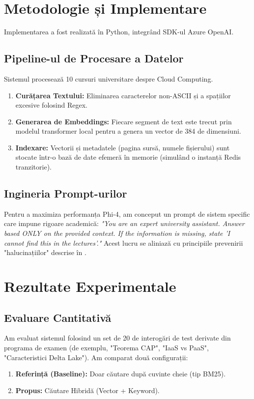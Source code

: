 \documentclass[conference]{IEEEtran}
\begin{document}
\section{Metodologie și Implementare}

Implementarea a fost realizată în Python, integrând SDK-ul Azure OpenAI.

\subsection{Pipeline-ul de Procesare a Datelor}
Sistemul procesează 10 cursuri universitare despre Cloud Computing.
\begin{enumerate}
    \item \textbf{Curățarea Textului:} Eliminarea caracterelor non-ASCII și a spațiilor excesive folosind Regex.
    \item \textbf{Generarea de Embeddings:} Fiecare segment de text este trecut prin modelul transformer local pentru a genera un vector de 384 de dimensiuni.
    \item \textbf{Indexare:} Vectorii și metadatele (pagina sursă, numele fișierului) sunt stocate într-o bază de date efemeră în memorie (simulând o instanță Redis tranzitorie).
\end{enumerate}

\subsection{Ingineria Prompt-urilor}
Pentru a maximiza performanța Phi-4, am conceput un prompt de sistem specific care impune rigoare academică:
\textit{"You are an expert university assistant. Answer based ONLY on the provided context. If the information is missing, state 'I cannot find this in the lectures'."}
Acest lucru se aliniază cu principiile prevenirii "halucinațiilor" descrise în \cite{ragas_eval}.

\section{Rezultate Experimentale}

\subsection{Evaluare Cantitativă}
Am evaluat sistemul folosind un set de 20 de interogări de test derivate din programa de examen (de exemplu, "Teorema CAP", "IaaS vs PaaS", "Caracteristici Delta Lake"). Am comparat două configurații:
\begin{enumerate}
    \item \textbf{Referință (Baseline):} Doar căutare după cuvinte cheie (tip BM25).
    \item \textbf{Propus:} Căutare Hibridă (Vector + Keyword).
\end{enumerate}
\end{document}
